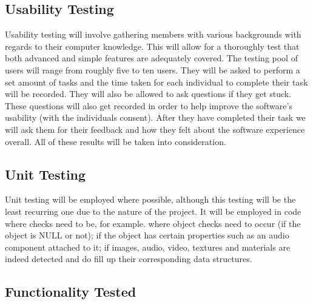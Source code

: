 \documentclass{article}
\begin{document}
	\subsection{Usability Testing}

	Usability testing will involve gathering members with various backgrounds with regards to their computer knowledge. This will allow for a thoroughly test that both
	advanced and simple features are adequately covered. The testing pool of users will range from roughly five to ten users. They will be asked to perform a set amount of
	tasks and the time taken for each individual to complete their task will be recorded. They will also be allowed to ask questions if they get stuck. These questions will
	also get recorded in order to help improve the software’s usability (with the individuals consent). After they have completed their task we will ask them for their
	feedback and how they felt about the software experience overall. All of these results will be taken into consideration.

	\subsection{Unit Testing}

	Unit testing will be employed where possible, although this testing will be the least recurring one due to the nature of the project. It will be employed in code
	where checks need to be, for example. where object checks need to occur (if the object is NULL or not); if the object has certain properties such as an audio
	component attached to it; if images, audio, video, textures and materials are indeed detected and do fill up their corresponding data structures.

	\subsection{Functionality Tested}
\end{document}

